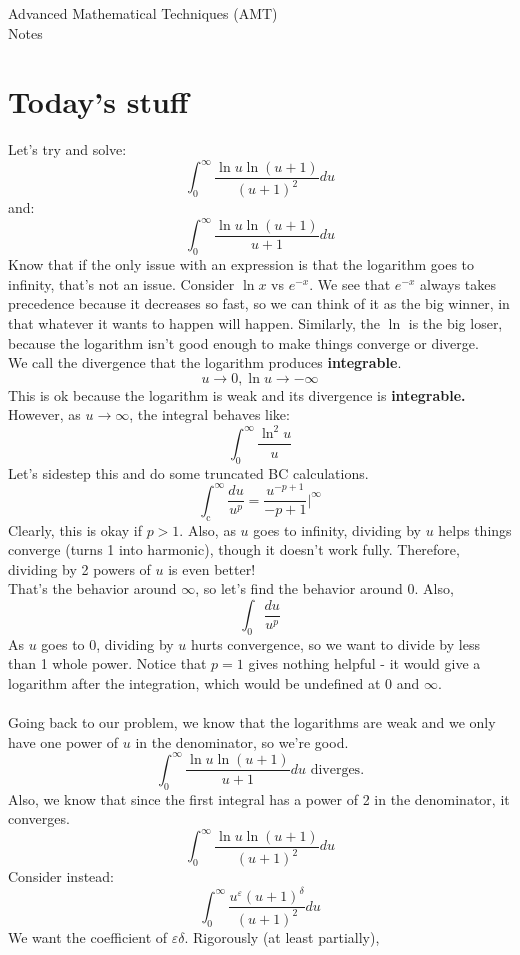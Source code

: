 \documentclass{article}
\begin{document}
\thispagestyle{fancy}
\begin{center}\LARGE{Advanced Mathematical Techniques (AMT) \\ Notes}\end{center}
\section{Today's stuff}
Let's try and solve:
\[\int_{0}^{\infty} \frac{\ln u \ln(u+1)}{(u+1)^2}du\]
and:
\[\int_{0}^{\infty} \frac{\ln u \ln (u+1)}{u+1}du\]
Know that if the only issue with an expression is that the logarithm goes to infinity, that's not an issue. Consider $\ln x$ vs $e^{-x}$. We see that $e^{-x}$ always takes precedence because it decreases so fast, so we can think of it as the big winner, in that whatever it wants to happen will happen. Similarly, the $\ln$ is the big loser, because the logarithm isn't good enough to make things converge or diverge.
\\ We call the divergence that the logarithm produces \textbf{integrable}. 
\[u \to 0, \ln u \to -\infty\]
This is ok because the logarithm is weak and its divergence is \textbf{integrable.} However, as $u \to \infty$, the integral behaves like:
\[\int_{0}^{\infty} \frac{\ln^2 u}{u}\]
Let's sidestep this and do some truncated BC calculations.
\[\int_{\text{c}}^{\infty} \frac{du}{u^p} = \frac{u^{-p+1}}{-p+1}\big|^\infty\]
Clearly, this is okay if $p > 1$. Also, as $u$ goes to infinity, dividing by $u$ helps things converge (turns 1 into harmonic), though it doesn't work fully. Therefore, dividing by 2 powers of $u$ is even better!
\\That's the behavior around $\infty$, so let's find the behavior around $0$. 
Also, \[\int_{0}^{} \frac{du}{u^p}\]
As $u$ goes to 0, dividing by $u$ hurts convergence, so we want to divide by less than 1 whole power. Notice that $p=1$ gives nothing helpful - it would give a logarithm after the integration, which would be undefined at $0$ and $\infty$.
\\\\Going back to our problem, we know that the logarithms are weak and we only have one power of $u$ in the denominator, so we're good.
\[\int_{0}^{\infty} \frac{\ln u \ln (u+1)}{u+1}du \text{   diverges.}\]
Also, we know that since the first integral has a power of 2 in the denominator, it converges.
\[\int_{0}^{\infty} \frac{\ln u \ln(u+1)}{(u+1)^2}du\]
Consider instead:
\[\int_{0}^{\infty} \frac{u^{\varepsilon} (u+1)^{\delta}}{(u+1)^2}du\]
We want the coefficient of $\varepsilon \delta$. Rigorously (at least partially),
\end{document}
